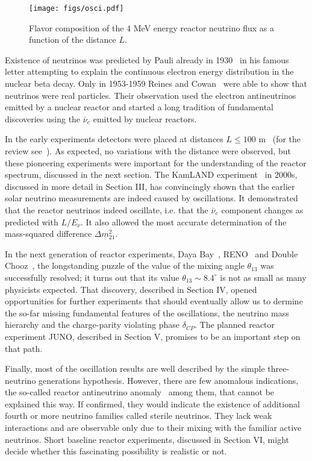 \begin{figure}[htb]
\begin{centering}
\texttt{[image: figs/osci.pdf]}
\par\end{centering}
\caption{\label{fig:intro1} Flavor composition of the 4 MeV energy reactor neutrino flux as a function of the distance  $L$. }
\end{figure}

Existence of neutrinos was predicted by Pauli already in 1930~\cite{Pauli30} in his famous letter attempting to explain the continuous electron
energy distribution in the nuclear beta decay. Only in 1953-1959 Reines and Cowan~\cite{Reines53,Cowan56,Reines59} were able to show that neutrinos
were real particles. Their observation used the electron antineutrinos emitted by a nuclear reactor and started a long tradition of fundamental
discoveries using the $\bar{\nu}_e$ emitted by nuclear reactors.

In the early experiments detectors were placed at distances $L \le 100$ m~\cite{ILL,Gosgen,Rovno,Krasnoyarsk,SRP,Bugey4,Bugey3} (for the review see~\cite{Bemporad02}). As expected, no variations
with the distance were observed, but these pioneering experiments were important for the understanding of the reactor spectrum, discussed
in the next section. The KamLAND experiment~\cite{Kamland03,Kamland05,Kamland08} in 2000s, discussed in more detail in Section III, has convincingly shown that the earlier
solar neutrino measurements are indeed  caused by oscillations. It demonstrated that the reactor neutrinos indeed
oscillate, i.e. that the $\bar{\nu}_e$ component changes as predicted with $L/E_{\nu}$. It also allowed the most accurate determination of the 
mass-squared difference $\Delta m^2_{21}$.  

In the next generation of reactor experiments, Daya Bay~\cite{Dayabay,Dayabay14}, RENO~\cite{Reno}  and Double Chooz~\cite{DChooz,DChooz14}, the longstanding puzzle of the
value of the mixing angle $\theta_{13}$ was successfully resolved; it turns out that its value $\theta_{13} \sim 8.4^\circ$
is not as small as many physicists expected. That discovery, described in Section IV, opened opportunities for further experiments that should  
eventually allow us to dermine the so-far missing fundamental features of the oscillations, the neutrino mass hierarchy and the charge-parity violating phase
$\delta_{CP}$. The planned reactor experiment JUNO, described in Section V,  promises to be an important step on that path.

Finally, most of the oscillation results are well described by the simple three-neutrino generations hypothesis. However, there are few anomalous indications,
the so-called reactor antineutrino anomaly~\cite{Mention} among them, that cannot be explained this way. If confirmed, they would indicate the existence of additional
fourth or more neutrino families called sterile neutrinos. They lack  weak interactions and are observable only due to their mixing with the familiar active neutrinos.  Short baseline
reactor experiments, discussed in Section VI, might decide whether this fascinating possibility is realistic or not.
